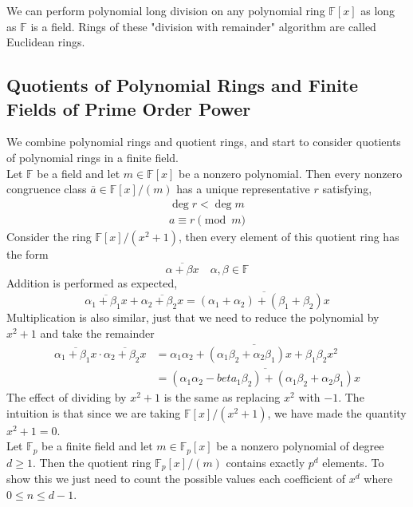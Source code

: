 \documentclass{article}
\begin{document}
\noindent We can perform polynomial long division on any polynomial ring $\mathbb{F}[x]$ as long as $\mathbb{F}$ is a field. Rings of these "division with remainder" algorithm are called Euclidean rings.

\subsection{Quotients of Polynomial Rings and Finite Fields of Prime Order Power}
We combine polynomial rings and quotient rings, and start to consider quotients of polynomial rings in a finite field.\\

\noindent Let $\mathbb{F}$ be a field and let $m \in \mathbb{F}[x]$ be a nonzero polynomial. Then every nonzero congruence class $\overline{a} \in \mathbb{F}[x]/(m)$ has a unique representative $r$ satisfying,
\begin{gather}
    \deg r < \deg m \\
    a \equiv r \pmod m
\end{gather}
Consider the ring $\mathbb{F}[x]/(x^2 + 1)$, then every element of this quotient ring has the form 
\begin{equation}
    \overline{\alpha + \beta x} \quad \alpha,\beta \in \mathbb{F}
\end{equation}
Addition is performed as expected,
\begin{equation}
    \overline{\alpha_1 + \beta_1 x} + \overline{\alpha_2 + \beta_2 x} = \overline{(\alpha_1 + \alpha_2) + (\beta_1 + \beta_2)x}
\end{equation}
Multiplication is also similar, just that we need to reduce the polynomial by $x^2 + 1$ and take the remainder
\begin{align}
    \overline{\alpha_1 + \beta_1 x} \cdot \overline{\alpha_2 + \beta_2 x} &= \overline{\alpha_1\alpha_2 + (\alpha_1\beta_2 + \alpha_2 \beta_1)x + \beta_1\beta_2 x^2} \\
    &= \overline{(\alpha_1\alpha_2 - beta_1\beta_2) + (\alpha_1\beta_2 + \alpha_2 \beta_1)x}
\end{align}
The effect of dividing by $x^2 + 1$ is the same as replacing $x^2$ with $-1$. The intuition is that since we are taking $\mathbb{F}[x]/(x^2+1)$, we have made the quantity $x^2 + 1 = 0$. \\

\noindent Let $\mathbb{F}_p$ be a finite field and let $m \in \mathbb{F}_p[x]$ be a nonzero polynomial of degree $d \geq 1$. Then the quotient ring $\mathbb{F}_p[x]/(m)$ contains exactly $p^d$ elements. To show this we just need to count the possible values each coefficient of $x^d$ where $0 \leq n \leq d-1$. \\
\end{document}
